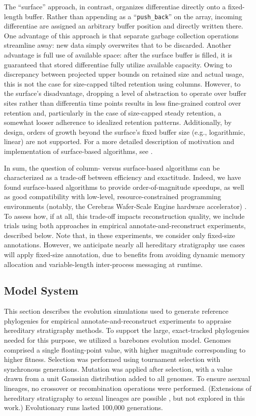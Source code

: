 The ``surface'' approach, in contrast, organizes differentiae directly onto a fixed-length buffer.
Rather than appending as a ``\texttt{push\_back}'' on the array, incoming differentiae are assigned an arbitrary buffer position and directly written there.
One advantage of this approach is that separate garbage collection operations streamline away: new data simply overwrites that to be discarded.
Another advantage is full use of available space: after the surface buffer is filled, it is guaranteed that stored differentiae fully utilize available capacity.
Owing to discrepancy between projected upper bounds on retained size and actual usage, this is not the case for size-capped tilted retention using columns.
However, to the surface's disadvantage, dropping a level of abstraction to operate over buffer sites rather than differentia time points results in less fine-grained control over retention and, particularly in the case of size-capped steady retention, a somewhat looser adherence to idealized retention patterns.
Additionally, by design, orders of growth beyond the surface's fixed buffer size (e.g., logarithmic, linear) are not supported.
For a more detailed description of motivation and implementation of surface-based algorithms, see \citep{moreno2024trackable}.

In sum, the question of column- versus surface-based algorithms can be characterized as a trade-off between efficiency and exactitude.
Indeed, we have found surface-based algorithms to provide order-of-magnitude speedups, as well as good compatibility with low-level, resource-constrained programming environments (notably, the Cerebras Wafer-Scale Engine hardware accelerator) \citep{moreno2024TODO}.
To assess how, if at all, this trade-off impacts reconstruction quality, we include trials using both approaches in empirical annotate-and-reconstruct experiments, described below.
Note that, in these experiments, we consider only fixed-size annotations.
However, we anticipate nearly all hereditary stratigraphy use cases will apply fixed-size annotation, due to benefits from avoiding dynamic memory allocation and variable-length inter-process messaging at runtime.

\subsection{Model System}

This section describes the evolution simulations used to generate reference phylogenies for empirical annotate-and-reconstruct experiments to appraise hereditary stratigraphy methods.
To support the large, exact-tracked phylogenies needed for this purpose, we utilized a barebones evolution model.
Genomes comprised a single floating-point value, with higher magnitude corresponding to higher fitness.
Selection was performed using tournament selection with synchronous generations.
Mutation was applied after selection, with a value drawn from a unit Gaussian distribution added to all genomes.
To ensure asexual lineages, no crossover or recombination operations were performed.
(Extensions of hereditary stratigraphy to sexual lineages are possible \citep{moreno2024methods}, but not explored in this work.)
Evolutionary runs lasted 100,000 generations.

